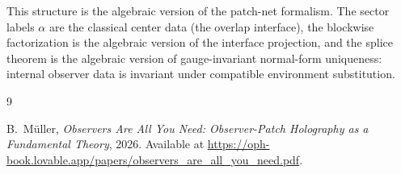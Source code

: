 \documentclass[11pt]{article}
\begin{document}
This structure is the algebraic version of the patch-net formalism. The sector labels $\alpha$ are the classical center data (the overlap interface), the blockwise factorization is the algebraic version of the interface projection, and the splice theorem is the algebraic version of gauge-invariant normal-form uniqueness: internal observer data is invariant under compatible environment substitution.


\begin{thebibliography}{9}

B.~M\"uller,
\emph{Observers Are All You Need: Observer-Patch Holography as a Fundamental Theory},
2026.
Available at \url{https://oph-book.lovable.app/papers/observers_are_all_you_need.pdf}.

\end{thebibliography}
\end{document}
